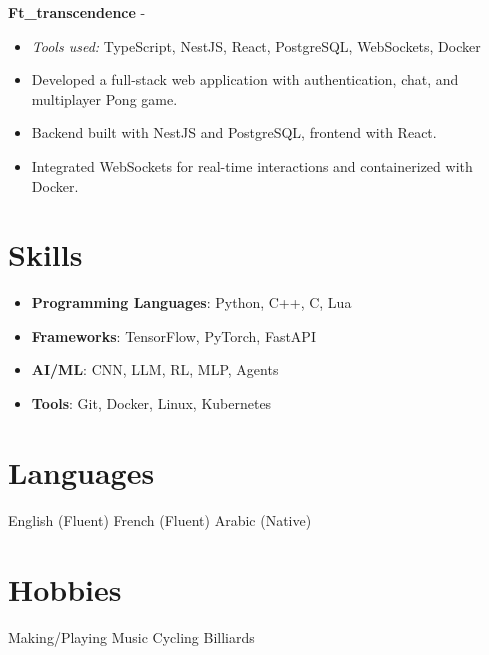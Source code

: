 \documentclass[a4paper,11pt]{article}%
\begin{document}
%
\noindent \textbf{Ft\_transcendence} - \href{https://github.com/sboof911/ft_transcendence}{{}}%
\begin{itemize}[leftmargin=2em,label={},parsep=0pt,topsep=1em]%
\item \textit{Tools used:} TypeScript, NestJS, React, PostgreSQL, WebSockets, Docker%
\item Developed a full-stack web application with authentication, chat, and multiplayer Pong game.%
\item Backend built with NestJS and PostgreSQL, frontend with React.%
\item Integrated WebSockets for real-time interactions and containerized with Docker.%
\end{itemize}%
\section*{Skills}%
\begin{itemize}[leftmargin=*]%
\item \textbf{Programming Languages}: Python, C++, C, Lua%
\item \textbf{Frameworks}: TensorFlow, PyTorch, FastAPI%
\item \textbf{AI/ML}: CNN, LLM, RL, MLP, Agents%
\item \textbf{Tools}: Git, Docker, Linux, Kubernetes%
\end{itemize}%
\section*{Languages}%
English (Fluent)%
\newline%
%
French (Fluent)%
\newline%
%
Arabic (Native)%
\newline%
%
\section*{Hobbies}%
Making/Playing Music%
\newline%
%
Cycling%
\newline%
%
Billiards%
\newline%
%
\end{document}
